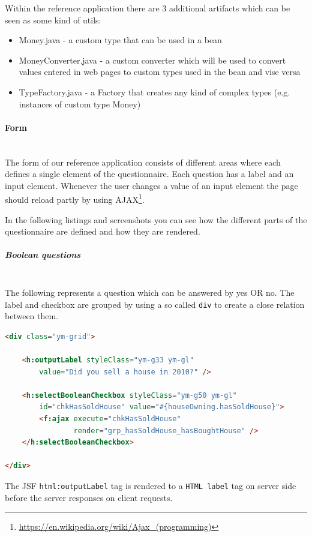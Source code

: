 Within the reference application there are 3 additional artifacts which can be
seen as some kind of utils:

\begin{itemize}
\item Money.java - a custom type that can be used in a bean
\item MoneyConverter.java - a custom converter which will be used to convert
values entered in web pages to custom types used in the bean and vise versa
\item TypeFactory.java - a Factory that creates any kind of complex types (e.g.
instances of custom type Money)
\end{itemize} 


\paragraph{Form} $\;$ \\
The form of our reference application consists of different areas where each
defines a single element of the questionnaire. Each question has a label and an
input element. Whenever the user changes a value of an input element the page should reload partly by using
AJAX\footnote{\url{https://en.wikipedia.org/wiki/Ajax\_(programming)}}.

In the following listings and screenshots you can see how the different parts
of the questionnaire are defined and how they are rendered. 

\subparagraph{Boolean questions}
\label{subpara:booleanAnswer}
$\;$ \\The following represents a question which can be answered by yes OR no.
The label and checkbox are grouped by using a so called \texttt{div} to create a close relation
between them.

\begin{lstlisting}[language=HTML]
<div class="ym-grid">

	<h:outputLabel styleClass="ym-g33 ym-gl"
		value="Did you sell a house in 2010?" />

	<h:selectBooleanCheckbox styleClass="ym-g50 ym-gl"
		id="chkHasSoldHouse" value="#{houseOwning.hasSoldHouse}">
		<f:ajax execute="chkHasSoldHouse"
				render="grp_hasSoldHouse_hasBoughtHouse" />
	</h:selectBooleanCheckbox>

</div>
\end{lstlisting}

The JSF \texttt{html:outputLabel} tag is rendered to a \texttt{HTML
label} tag on server side before the server responses on client requests. 

